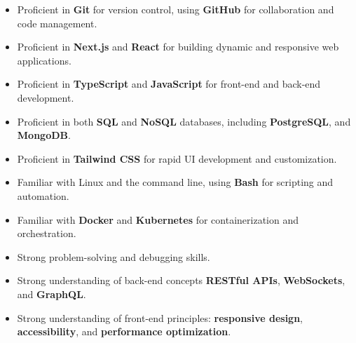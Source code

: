 \documentclass[9pt,a4paper,ragged2e,withhyper]{altacv}
\begin{document}
\begin{paracol}{2}
	\begin{itemize}
		\item Proficient in \textbf{Git} for version control, using \textbf{GitHub} for
		      collaboration and code management.
		\item Proficient in \textbf{Next.js} and \textbf{React} for building dynamic and
		      responsive web applications.
		\item Proficient in \textbf{TypeScript} and \textbf{JavaScript} for front-end and
		      back-end development.
		\item Proficient in both \textbf{SQL} and \textbf{NoSQL} databases, including
		      \textbf{PostgreSQL}, and \textbf{MongoDB}.
		\item Proficient in \textbf{Tailwind CSS} for rapid UI development and customization.
		\item Familiar with Linux and the command line, using \textbf{Bash} for scripting and
		      automation.
		\item Familiar with \textbf{Docker} and \textbf{Kubernetes} for containerization and
		      orchestration.
		\item Strong problem-solving and debugging skills.
		\item Strong understanding of back-end concepts \textbf{RESTful APIs},
		      \textbf{WebSockets}, and \textbf{GraphQL}.
		\item Strong understanding of front-end principles: \textbf{responsive design},
		      \textbf{accessibility}, and \textbf{performance optimization}.
	\end{itemize}
\end{paracol}

\newpage


\end{document}

